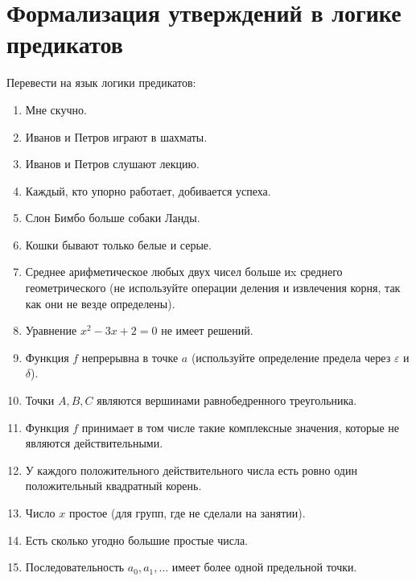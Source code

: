 \documentclass{article}
\begin{document}
\section{Формализация утверждений в логике предикатов}
Перевести на язык логики предикатов:
\begin{enumerate}
    \item Мне скучно.
    \item Иванов и Петров играют в шахматы.
    \item Иванов и Петров слушают лекцию.
    \item Каждый, кто упорно работает, добивается успеха.
    \item Слон Бимбо больше собаки Ланды.
    \item Кошки бывают только белые и серые.
    \item Среднее арифметическое любых двух чисел больше иx среднего геометрического (не используйте операции деления и извлечения корня, так как они не везде определены).
    \item Уравнение $x^2 - 3x + 2 = 0$ не имеет решений.
    \item Функция $f$ непрерывна в точке $a$ (используйте определение предела через $\varepsilon$ и $\delta$).
    \item Точки $A, B, C$ являются вершинами равнобедренного треугольника.
    \item Функция $f$ принимает в том числе такие комплексные значения, которые не являются действительными.
    \item У каждого положительного действительного числа есть ровно один положительный квадратный корень.
    \item Число $x$ простое (для групп, где не сделали на занятии).
    \item Есть сколько угодно большие простые числа.
    \item Последовательность $a_0, a_1, \ldots$ имеет более одной предельной точки.
\end{enumerate}
\end{document}
